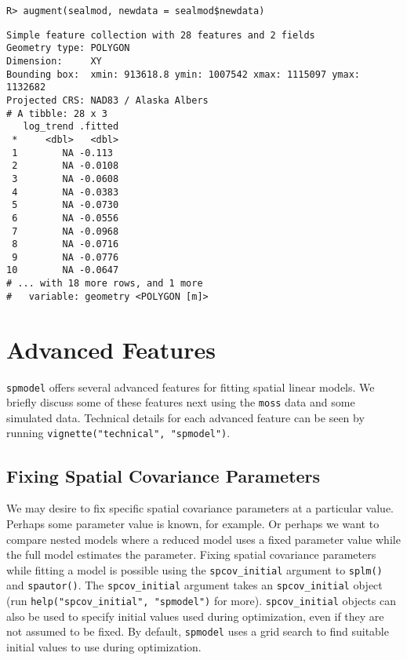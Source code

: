 \documentclass[10pt,letterpaper]{article}
\begin{document}
\begin{verbatim}
R> augment(sealmod, newdata = sealmod$newdata)
\end{verbatim}

\begin{verbatim}
Simple feature collection with 28 features and 2 fields
Geometry type: POLYGON
Dimension:     XY
Bounding box:  xmin: 913618.8 ymin: 1007542 xmax: 1115097 ymax: 1132682
Projected CRS: NAD83 / Alaska Albers
# A tibble: 28 x 3
   log_trend .fitted
 *     <dbl>   <dbl>
 1        NA -0.113 
 2        NA -0.0108
 3        NA -0.0608
 4        NA -0.0383
 5        NA -0.0730
 6        NA -0.0556
 7        NA -0.0968
 8        NA -0.0716
 9        NA -0.0776
10        NA -0.0647
# ... with 18 more rows, and 1 more
#   variable: geometry <POLYGON [m]>
\end{verbatim}

\hypertarget{sec:advfeatures}{%
\section{Advanced Features}\label{sec:advfeatures}}

\texttt{spmodel} offers several advanced features for fitting spatial
linear models. We briefly discuss some of these features next using the
\texttt{moss} data and some simulated data. Technical details for each
advanced feature can be seen by running
\texttt{vignette("technical",\ "spmodel")}.

\hypertarget{fixing-spatial-covariance-parameters}{%
\subsection{Fixing Spatial Covariance
Parameters}\label{fixing-spatial-covariance-parameters}}

We may desire to fix specific spatial covariance parameters at a
particular value. Perhaps some parameter value is known, for example. Or
perhaps we want to compare nested models where a reduced model uses a
fixed parameter value while the full model estimates the parameter.
Fixing spatial covariance parameters while fitting a model is possible
using the \texttt{spcov\_initial} argument to \texttt{splm()} and
\texttt{spautor()}. The \texttt{spcov\_initial} argument takes an
\texttt{spcov\_initial} object (run
\texttt{help("spcov\_initial",\ "spmodel")} for more).
\texttt{spcov\_initial} objects can also be used to specify initial
values used during optimization, even if they are not assumed to be
fixed. By default, \texttt{spmodel} uses a grid search to find suitable
initial values to use during optimization.
\end{document}
